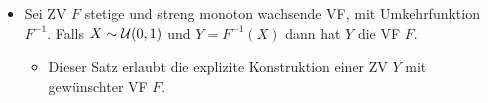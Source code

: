 \begin{itemize}
    \item Sei ZV $F$ stetige und streng monoton wachsende VF, mit Umkehrfunktion $F^{-1}$. Falls $X \sim \mathcal{U}(0, 1)$ und $Y = F^{-1}(X)$ dann hat $Y$ die VF $F$.
        \begin{itemize}
            \item Dieser Satz erlaubt die explizite Konstruktion einer ZV $Y$ mit gewünschter VF $F$.
        \end{itemize}
\end{itemize}

